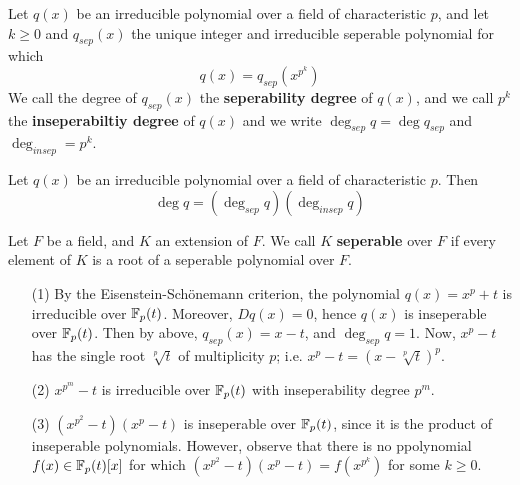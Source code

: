 \begin{definition}
  Let $q(x)$ be an irreducible polynomial over a field of
  characteristic $p$, and let $k \geq 0$ and $q_{sep}(x)$ the unique
  integer and irreducible seperable polynomial for which
  \begin{equation*}
    q(x)=q_{sep}(x^{p^k})
  \end{equation*}
  We call the degree of $q_{sep}(x)$ the \textbf{seperability degree}
  of $q(x)$, and we call $p^k$ the  \textbf{inseperabiltiy degree} of
  $q(x)$ and we write $\deg_{sep}{q}=\deg{q_{sep}}$ and
  $\deg_{insep}=p^k$.
\end{definition}

\begin{proposition}\label{proposition_8.6.7}
  Let $q(x)$ be an irreducible polynomial over a field of
  characteristic $p$. Then
  \begin{equation*}
    \deg{q}=(\deg_{sep}{q})(\deg_{insep}{q})
  \end{equation*}
\end{proposition}

\begin{definition}
  Let $F$ be a field, and $K$ an extension of $F$. We call  $K$
  \textbf{seperable} over $F$ if every element of  $K$ is a root of a
  seperable polynomial over  $F$.
\end{definition}

\begin{example}\label{example_8.16}
  \begin{enumerate}
    \item[(1)] By the Eisenstein-Sch\"onemann criterion, the
      polynomial $q(x)=x^p+t$ is irreducible over $\mathbb{F}_p(t)$. Moreover,
      $D{q(x)}=0$, hence $q(x)$ is inseperable over $\mathbb{F}_p(t)$. Then by
      above, $q_{sep}(x)=x-t$, and $\deg_{sep}{q}=1$. Now, $x^p-t$ has
      the single root  $\sqrt[p]{t}$ of multiplicity $p$; i.e.
      $x^p-t=(x-\sqrt[p]{t})^p$.

    \item[(2)] $x^{p^m}-t$ is irreducible over $\mathbb{F}_p(t)$ with
      inseperability degree $p^m$.

    \item[(3)] $(x^{p^2}-t)(x^p-t)$ is inseperable over $\mathbb{F}_p(t)$,
      since it is the product of inseperable polynomials. However,
      observe that there is no ppolynomial $f(x) \in \mathbb{F}_p(t)[x]$ for
      which $(x^{p^2}-t)(x^p-t)=f(x^{p^k})$ for some $k \geq 0$.
  \end{enumerate}
\end{example}
